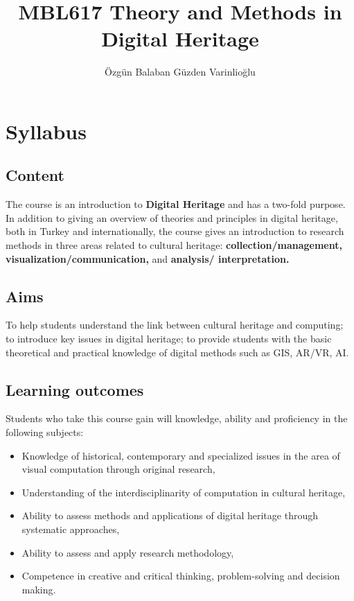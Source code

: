 \documentclass[
]{book}
\title{MBL617 Theory and Methods in Digital Heritage}
\author{Özgün Balaban Güzden Varinlioğlu}
\date{}
\providecommand{\tightlist}{%
  \setlength{\itemsep}{0pt}\setlength{\parskip}{0pt}}
\begin{document}
\maketitle

{
\setcounter{tocdepth}{1}
\tableofcontents
}
\hypertarget{intro}{%
\chapter{Syllabus}\label{intro}}

\hypertarget{content}{%
\section{Content}\label{content}}

The course is an introduction to \textbf{Digital Heritage} and has a two-fold purpose. In addition to giving an overview of theories and principles in digital heritage, both in Turkey and internationally, the course gives an introduction to research methods in three areas related to cultural heritage: \textbf{collection/management, visualization/communication,} and \textbf{analysis/ interpretation.}

\hypertarget{aims}{%
\section{Aims}\label{aims}}

To help students understand the link between cultural heritage and computing; to introduce key issues in digital heritage; to provide students with the basic theoretical and practical knowledge of digital methods such as GIS, AR/VR, AI.

\hypertarget{learning-outcomes}{%
\section{Learning outcomes}\label{learning-outcomes}}

Students who take this course gain will knowledge, ability and proficiency in the following subjects:

\begin{itemize}
\tightlist
\item
  Knowledge of historical, contemporary and specialized issues in the area of visual computation through original research,
\item
  Understanding of the interdisciplinarity of computation in cultural heritage,
\item
  Ability to assess methods and applications of digital heritage through systematic approaches,
\item
  Ability to assess and apply research methodology,
\item
  Competence in creative and critical thinking, problem-solving and decision making.
\end{itemize}
\end{document}
